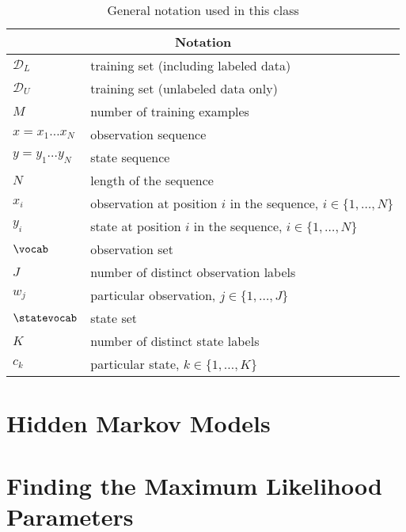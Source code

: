 \begin{table}[h]
\begin{center}
\begin{tabular}{|l|l|}
\hline
\multicolumn{2}{|c|}{Notation}\\
\hline
\hline
$\mathcal{D}_L$ & training set (including labeled data)\\
\hline
$\mathcal{D}_U$ & training set (unlabeled data only)\\
\hline
$M$  & number of training examples \\
\hline
$x = x_1 \ldots x_N$  & observation sequence \\
\hline
$y = y_1 \ldots y_N$  & state sequence \\
\hline

$N$  & length of the sequence \\
\hline
$x_i$ &  observation at position $i$ in the sequence, $i \in \{1,\ldots,N\}$\\
\hline
$y_i$ &  state at position $i$ in the sequence, $i \in \{1,\ldots,N\}$\\
\hline
$\vocab$ & observation set\\
\hline 
$J$ & number of distinct observation labels\\
\hline 
$w_j$ & particular observation, $j \in \{1,\ldots,J\}$\\
\hline 
$\statevocab$ & state set\\
\hline 
$K$ & number of distinct state labels\\
\hline 
$c_k$ & particular state, $k \in \{1,\ldots,K\}$\\
\hline  
\end{tabular}
\end{center}
\label{tab:hmm_notation}
\caption{General notation used in this class}
\end{table}








\section{\label{hmm} Hidden Markov Models}






\section{\label{ml} Finding the Maximum Likelihood Parameters}





